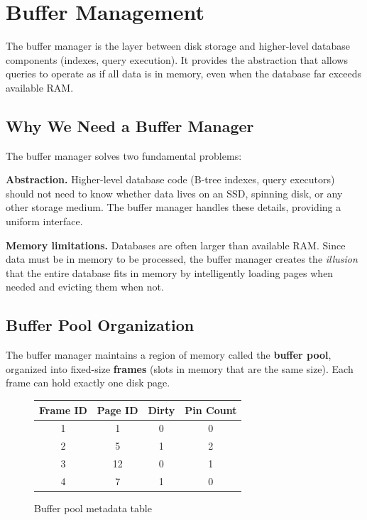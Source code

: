 \section{Buffer Management}

The buffer manager is the layer between disk storage and higher-level database components (indexes, query execution). It provides the abstraction that allows queries to operate as if all data is in memory, even when the database far exceeds available RAM.

\subsection{Why We Need a Buffer Manager}

The buffer manager solves two fundamental problems:

\textbf{Abstraction.} Higher-level database code (B-tree indexes, query executors) should not need to know whether data lives on an SSD, spinning disk, or any other storage medium. The buffer manager handles these details, providing a uniform interface.

\textbf{Memory limitations.} Databases are often larger than available RAM. Since data must be in memory to be processed, the buffer manager creates the \textit{illusion} that the entire database fits in memory by intelligently loading pages when needed and evicting them when not.

\subsection{Buffer Pool Organization}

The buffer manager maintains a region of memory called the \textbf{buffer pool}, organized into fixed-size \textbf{frames} (slots in memory that are the same size). Each frame can hold exactly one disk page.

\begin{figure}[h]
\centering
\begin{tabular}{|c|c|c|c|}
\hline
\textbf{Frame ID} & \textbf{Page ID} & \textbf{Dirty} & \textbf{Pin Count} \\
\hline
1 & 1 & 0 & 0 \\
2 & 5 & 1 & 2 \\
3 & 12 & 0 & 1 \\
4 & 7 & 1 & 0 \\
\hline
\end{tabular}
\caption{Buffer pool metadata table}
\end{figure}

